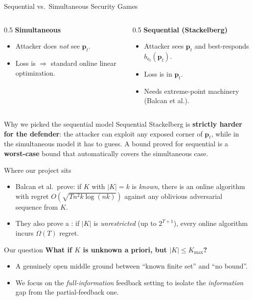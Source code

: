 \documentclass[10pt,aspectratio=169]{beamer}
\newcommand{\impterm}[1]{\textbf{\color{blueprimary}{#1}}}
\newcommand{\impcompterm}[1]{\textbf{\color{darkgreen}{#1}}}
\newcommand{\pvec}{\mathbf{p}}
\newcommand{\Kmax}{K_{\max}}
\begin{document}
\begin{frame}{Sequential vs.\ Simultaneous Security Games}
\vspace{-4pt}
\begin{columns}[T]
\begin{column}{0.5\textwidth}
\textbf{Simultaneous}
\begin{itemize}\small
\item Attacker does \emph{not} see $\pvec_t$.
\item Loss is \impcompterm{linear in $\pvec$} $\Rightarrow$ standard online linear optimization.
\end{itemize}
\end{column}
\begin{column}{0.5\textwidth}
\textbf{Sequential (Stackelberg)}
\begin{itemize}\small
\item Attacker sees $\pvec_t$ and best-responds $b_{a_t}(\pvec_t)$.
\item Loss is \impterm{non-linear, non-convex, discontinuous} in $\pvec_t$.
\item Needs extreme-point machinery (Balcan et al.).
\end{itemize}
\end{column}
\end{columns}
\vspace{4pt}
\begin{alertblock}{Why we picked the sequential model}
Sequential Stackelberg is \textbf{strictly harder for the defender}: the attacker can exploit any exposed corner of $\pvec_t$, while in the simultaneous model it has to guess. A bound proved for sequential is a \textbf{worst-case} bound that automatically covers the simultaneous case.
\end{alertblock}
\end{frame}


\begin{frame}{Where our project sits}
\begin{itemize}
  \item Balcan et al.\ prove: if $K$ with $|K|=k$ is \emph{known}, there is an online algorithm with regret $O(\sqrt{Tn^2 k\log(nk)})$ against any oblivious adversarial sequence from $K$.
  \item They also prove a \impterm{matching lower bound}: if $|K|$ is \emph{unrestricted} (up to $2^{T+1}$), every online algorithm incurs $\Omega(T)$ regret.
\end{itemize}
\pause
\vspace{4pt}
\begin{alertblock}{Our question}
\centering\textbf{What if $K$ is unknown a priori, but $|K|\le\Kmax$?}
\end{alertblock}
\pause
\vspace{2pt}
\begin{itemize}
  \item A genuinely open middle ground between ``known finite set'' and ``no bound''.
  \item We focus on the \emph{full-information} feedback setting to isolate the \emph{information} gap from the partial-feedback one.
\end{itemize}
\end{frame}
\end{document}
